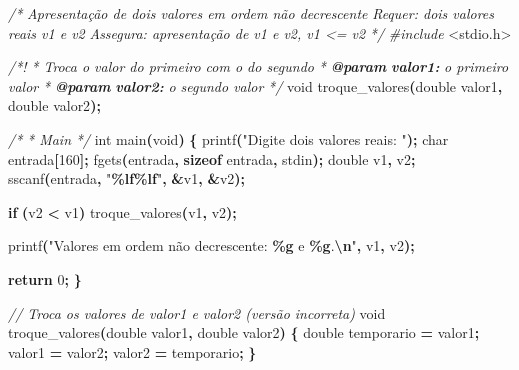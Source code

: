 \documentclass[
  11pt,
  a4paper,
]{scrbook}
\newenvironment{Shaded}{\begin{snugshade}}{\end{snugshade}}
\newcommand{\AnnotationTok}[1]{\textcolor[rgb]{0.56,0.35,0.01}{\textbf{\textit{#1}}}}
\newcommand{\CommentTok}[1]{\textcolor[rgb]{0.56,0.35,0.01}{\textit{#1}}}
\newcommand{\CommentVarTok}[1]{\textcolor[rgb]{0.56,0.35,0.01}{\textbf{\textit{#1}}}}
\newcommand{\ControlFlowTok}[1]{\textcolor[rgb]{0.13,0.29,0.53}{\textbf{#1}}}
\newcommand{\DataTypeTok}[1]{\textcolor[rgb]{0.13,0.29,0.53}{#1}}
\newcommand{\DecValTok}[1]{\textcolor[rgb]{0.00,0.00,0.81}{#1}}
\newcommand{\ImportTok}[1]{#1}
\newcommand{\KeywordTok}[1]{\textcolor[rgb]{0.13,0.29,0.53}{\textbf{#1}}}
\newcommand{\NormalTok}[1]{#1}
\newcommand{\OperatorTok}[1]{\textcolor[rgb]{0.81,0.36,0.00}{\textbf{#1}}}
\newcommand{\PreprocessorTok}[1]{\textcolor[rgb]{0.56,0.35,0.01}{\textit{#1}}}
\newcommand{\SpecialCharTok}[1]{\textcolor[rgb]{0.81,0.36,0.00}{\textbf{#1}}}
\newcommand{\StringTok}[1]{\textcolor[rgb]{0.31,0.60,0.02}{#1}}
\begin{document}
\begin{Shaded}
\begin{Highlighting}[]
\CommentTok{/*}
\CommentTok{Apresentação de dois valores em ordem não decrescente}
\CommentTok{Requer: dois valores reais v1 e v2}
\CommentTok{Assegura: apresentação de v1 e v2, v1 \textless{}= v2}
\CommentTok{*/}
\PreprocessorTok{\#include }\ImportTok{\textless{}stdio.h\textgreater{}}

\CommentTok{/*!}
\CommentTok{ * Troca o valor do primeiro com o do segundo}
\CommentTok{ * }\AnnotationTok{@param}\CommentTok{ }\CommentVarTok{valor1:}\CommentTok{ o primeiro valor}
\CommentTok{ * }\AnnotationTok{@param}\CommentTok{ }\CommentVarTok{valor2:}\CommentTok{ o segundo valor}
\CommentTok{ */}
\DataTypeTok{void}\NormalTok{ troque\_valores}\OperatorTok{(}\DataTypeTok{double}\NormalTok{ valor1}\OperatorTok{,} \DataTypeTok{double}\NormalTok{ valor2}\OperatorTok{);}

\CommentTok{/*}
\CommentTok{ * Main}
\CommentTok{ */}
\DataTypeTok{int}\NormalTok{ main}\OperatorTok{(}\DataTypeTok{void}\OperatorTok{)} \OperatorTok{\{}
\NormalTok{    printf}\OperatorTok{(}\StringTok{"Digite dois valores reais: "}\OperatorTok{);}
    \DataTypeTok{char}\NormalTok{ entrada}\OperatorTok{[}\DecValTok{160}\OperatorTok{];}
\NormalTok{    fgets}\OperatorTok{(}\NormalTok{entrada}\OperatorTok{,} \KeywordTok{sizeof}\NormalTok{ entrada}\OperatorTok{,}\NormalTok{ stdin}\OperatorTok{);}
    \DataTypeTok{double}\NormalTok{ v1}\OperatorTok{,}\NormalTok{ v2}\OperatorTok{;}
\NormalTok{    sscanf}\OperatorTok{(}\NormalTok{entrada}\OperatorTok{,} \StringTok{"}\SpecialCharTok{\%lf\%lf}\StringTok{"}\OperatorTok{,} \OperatorTok{\&}\NormalTok{v1}\OperatorTok{,} \OperatorTok{\&}\NormalTok{v2}\OperatorTok{);}

    \ControlFlowTok{if} \OperatorTok{(}\NormalTok{v2 }\OperatorTok{\textless{}}\NormalTok{ v1}\OperatorTok{)}
\NormalTok{        troque\_valores}\OperatorTok{(}\NormalTok{v1}\OperatorTok{,}\NormalTok{ v2}\OperatorTok{);}

\NormalTok{    printf}\OperatorTok{(}\StringTok{"Valores em ordem não decrescente: }\SpecialCharTok{\%g}\StringTok{ e }\SpecialCharTok{\%g}\StringTok{.}\SpecialCharTok{\textbackslash{}n}\StringTok{"}\OperatorTok{,}\NormalTok{ v1}\OperatorTok{,}\NormalTok{ v2}\OperatorTok{);}

    \ControlFlowTok{return} \DecValTok{0}\OperatorTok{;}
\OperatorTok{\}}

\CommentTok{// Troca os valores de valor1 e valor2 (versão incorreta)}
\DataTypeTok{void}\NormalTok{ troque\_valores}\OperatorTok{(}\DataTypeTok{double}\NormalTok{ valor1}\OperatorTok{,} \DataTypeTok{double}\NormalTok{ valor2}\OperatorTok{)} \OperatorTok{\{}
    \DataTypeTok{double}\NormalTok{ temporario }\OperatorTok{=}\NormalTok{ valor1}\OperatorTok{;}
\NormalTok{    valor1 }\OperatorTok{=}\NormalTok{ valor2}\OperatorTok{;}
\NormalTok{    valor2 }\OperatorTok{=}\NormalTok{ temporario}\OperatorTok{;}
\OperatorTok{\}}
\end{Highlighting}
\end{Shaded}
\end{document}
